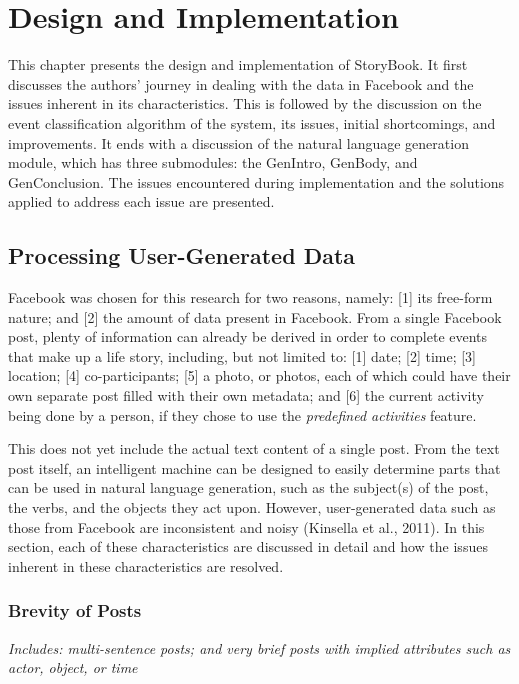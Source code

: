 \chapter{Design and Implementation}
\label{sec:designandimplementation} 

This chapter presents the design and implementation of StoryBook. It first discusses the authors’ journey in dealing with the data in Facebook and the issues inherent in its characteristics. This is followed by the discussion on the event classification algorithm of the system, its issues, initial shortcomings, and improvements. It ends with a discussion of the natural language generation module, which has three submodules: the GenIntro, GenBody, and GenConclusion. The issues encountered during implementation and the solutions applied to address each issue are presented.

\section{Processing User-Generated Data}
Facebook was chosen for this research for two reasons, namely: [1] its free-form nature; and [2] the amount of data present in Facebook. From a single Facebook post, plenty of information can already be derived in order to complete events that make up a life story, including, but not limited to: [1] date; [2] time; [3] location; [4] co-participants; [5] a photo, or photos, each of which could have their own separate post filled with their own metadata; and [6] the current activity being done by a person, if they chose to use the \textit{predefined activities} feature.

This does not yet include the actual text content of a single post. From the text post itself, an intelligent machine can be designed to easily determine parts that can be used in natural language generation, such as the subject(s) of the post, the verbs, and the objects they act upon. However, user-generated data such as those from Facebook are inconsistent and noisy (Kinsella et al., 2011). In this section, each of these characteristics are discussed in detail and how the issues inherent in these characteristics are resolved.

\subsection{Brevity of Posts}
\textit{Includes: multi-sentence posts; and very brief posts with implied attributes such as actor, object, or time}


